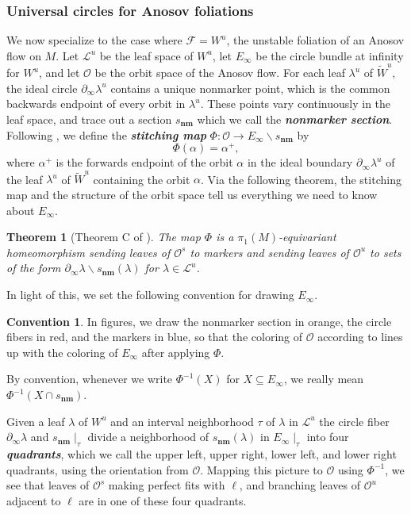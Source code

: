 \documentclass[11pt]{amsart}
\renewcommand{\l}{\lambda}
\newcommand{\wt}{\widetilde}
\newcommand{\mc}{\mathcal}
\newcommand{\orb}{\mathcal{O}}
\newcommand\ssm{\smallsetminus}
\newcommand{\defn}[1]{\textbf{\emph{#1}}}
\newcommand{\snm}{s_\mathbf{nm}}
\numberwithin{equation}{section}
\newtheorem{theorem}[equation]{Theorem}
\theoremstyle{definition}
\newtheorem{convention}[equation]{Convention}
\begin{document}
\subsubsection{Universal circles for Anosov foliations}\label{sec:anosov_uc_background}
We now specialize to the case where $\mc F=W^u$, the unstable foliation of an Anosov flow on $M$. Let $\mc L^u$ be the leaf space of $W^u$, let $E_\infty$ be the circle bundle at infinity for $W^u$, and let $\orb$ be the orbit space of the Anosov flow. For each leaf $\l^u$ of $\wt W^u$, the ideal circle $\partial_\infty\l^u$ contains a unique nonmarker point, which is the common backwards endpoint of every orbit in $\l^u$. These points vary continuously in the leaf space, and trace out a section $\snm$ which we call the \defn{nonmarker section}. Following \cite{buckminster2025universal}, we define the \defn{stitching map} $\Phi\colon\orb\to E_\infty\ssm\snm$ by 
\[
\Phi(\alpha)=\alpha^+,
\]
where $\alpha^+$ is the forwards endpoint of the orbit $\alpha$ in the ideal boundary $\partial_\infty\l^u$ of the leaf $\l^u$ of $\wt W^u$ containing the orbit $\alpha$. Via the following theorem, the stitching map and the structure of the orbit space tell us everything we need to know about $E_\infty$.

\begin{theorem}[Theorem C of \cite{buckminster2025universal}]
	The map $\Phi$ is a $\pi_1(M)$-equivariant homeomorphism sending leaves of $\orb^s$ to markers and sending leaves of $\orb^u$ to sets of the form $\partial_\infty\l\ssm\snm(\l)$ for $\l\in\mc L^u$.
\end{theorem}

In light of this, we set the following convention for drawing $E_\infty$.

\begin{convention}\label{conv:Einfty}
	In figures, we draw the nonmarker section in orange, the circle fibers in red, and the markers in blue, so that the coloring of $\orb$ according to  lines up with the coloring of $E_\infty$ after applying $\Phi$.
\end{convention}

By convention, whenever we write $\Phi^{-1}(X)$ for $X\subseteq E_\infty$, we really mean $\Phi^{-1}(X\cap\snm)$.

Given a leaf $\l$ of $W^u$ and an interval neighborhood $\tau$ of $\l$ in $\mc L^u$ the circle fiber $\partial_\infty\l$ and $\snm\mid_\tau$ divide a neighborhood of $\snm(\l)$ in $E_\infty\mid_\tau$ into four \defn{quadrants}, which we call the upper left, upper right, lower left, and lower right quadrants, using the orientation from $\orb$. Mapping this picture to $\orb$ using $\Phi^{-1}$, we see that leaves of $\orb^s$ making perfect fits with $\ell$, and branching leaves of $\orb^u$ adjacent to $\ell$ are in one of these four quadrants.
\end{document}
